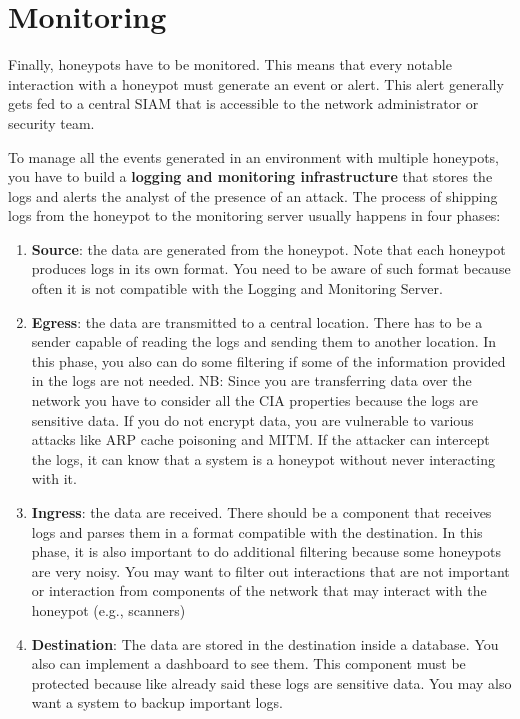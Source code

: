 \documentclass[epsfig,a4paper,11pt,titlepage,oneside,openany]{book}
\begin{document}
\section{Monitoring}

Finally, honeypots have to be monitored. This means that every notable interaction with a honeypot must generate an event or alert. This alert generally gets fed to a central SIAM that is accessible to the network administrator or security team.

To manage all the events generated in an environment with multiple honeypots, you have to build a \textbf{logging and monitoring infrastructure} that stores the logs and alerts the analyst of the presence of an attack. The process of shipping logs from the honeypot to the monitoring server usually happens in four phases:
\begin{enumerate}
\item \textbf{Source}: the data are generated from the honeypot. Note that each honeypot produces logs in its own format. You need to be aware of such format because often it is not compatible with the Logging and Monitoring Server.
\item \textbf{Egress}: the data are transmitted to a central location. There has to be a sender capable of reading the logs and sending them to another location. In this phase, you also can do some filtering  if some of the information provided in the logs are not needed. 
NB: Since you are transferring data over the network you have to consider all the CIA properties because the logs are sensitive data. If you do not encrypt data, you are vulnerable to various attacks like ARP cache poisoning and MITM. If the attacker can intercept the logs, it can know that a system is a honeypot without never interacting with it.

\item	\textbf{Ingress}: the data are received. There should be a component that receives logs and parses them in a format compatible with the destination. In this phase, it is also important to do additional filtering because  some honeypots are very noisy. You may want to filter out interactions that are not important or interaction from components of the network that may interact with the honeypot (e.g., scanners)
\item \textbf{Destination}: The data are stored in the destination inside a database.  You also can implement a dashboard to see them. This component must be protected because like already said these logs are sensitive data. You may also want a system to backup important logs.
\end{enumerate}
\end{document}
